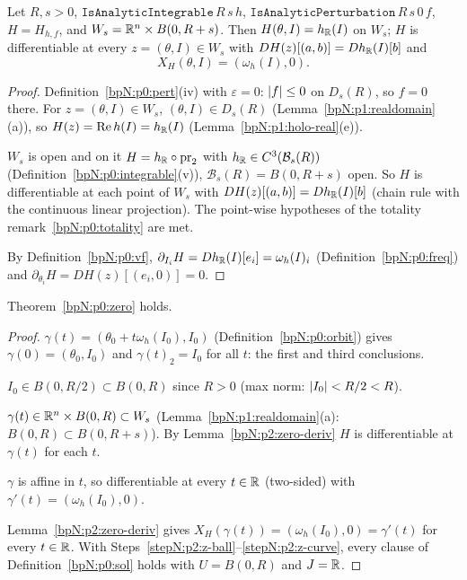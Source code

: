 \begin{lemma}\label{bpN:p2:zero-deriv}
Let $R,s>0$, $\texttt{IsAnalyticIntegrable}\,R\,s\,h$, $\texttt{IsAnalyticPerturbation}\,R\,s\,0\,f$, $H=H_{h,f}$, and $W_s=\mathbb{R}^n\times B(0,R+s)$. Then $H(\theta,I)=h_{\mathbb{R}}(I)$ on $W_s$; $H$ is differentiable at every $z=(\theta,I)\in W_s$ with $DH(z)[(a,b)]=Dh_{\mathbb{R}}(I)[b]$ and
\[X_H(\theta,I)=(\omega_h(I),0).\]
\end{lemma}
\begin{proof}
\label{stepN:p2:zd-zero} Definition~\ref{bpN:p0:pert}(iv) with $\varepsilon=0$: $\lvert f\rvert\le0$ on $D_s(R)$, so $f=0$ there. For $z=(\theta,I)\in W_s$, $(\theta,I)\in D_s(R)$ (Lemma~\ref{bpN:p1:realdomain}(a)), so $H(z)=\operatorname{Re}h(I)=h_{\mathbb{R}}(I)$ (Lemma~\ref{bpN:p1:holo-real}(e)).

\label{stepN:p2:zd-diff} $W_s$ is open and on it $H=h_{\mathbb{R}}\circ\mathrm{pr}_2$ with $h_{\mathbb{R}}\in C^3(\mathcal B_s(R))$ (Definition~\ref{bpN:p0:integrable}(v)), $\mathcal B_s(R)=B(0,R+s)$ open. So $H$ is differentiable at each point of $W_s$ with $DH(z)[(a,b)]=Dh_{\mathbb{R}}(I)[b]$ (chain rule with the continuous linear projection). The point-wise hypotheses of the totality remark~\ref{bpN:p0:totality} are met.

\label{stepN:p2:zd-field} By Definition~\ref{bpN:p0:vf}, $\partial_{I_i}H=Dh_{\mathbb{R}}(I)[e_i]=\omega_h(I)_i$ (Definition~\ref{bpN:p0:freq}) and $\partial_{\theta_i}H=DH(z)[(e_i,0)]=0$.
\end{proof}

\begin{theorem}[N-ZERO]\label{bpN:p2:zero}
Theorem~\ref{bpN:p0:zero} holds.
\end{theorem}
\begin{proof}
\label{stepN:p2:z-init} $\gamma(t)=(\theta_0+t\omega_h(I_0),I_0)$ (Definition~\ref{bpN:p0:orbit}) gives $\gamma(0)=(\theta_0,I_0)$ and $\gamma(t)_2=I_0$ for all $t$: the first and third conclusions.

\label{stepN:p2:z-ball} $I_0\in B(0,R/2)\subset B(0,R)$ since $R>0$ (max norm: $\lvert I_0\rvert<R/2<R$).

\label{stepN:p2:z-H} $\gamma(t)\in\mathbb{R}^n\times B(0,R)\subset W_s$ (Lemma~\ref{bpN:p1:realdomain}(a): $B(0,R)\subset B(0,R+s)$). By Lemma~\ref{bpN:p2:zero-deriv} $H$ is differentiable at $\gamma(t)$ for each $t$.

\label{stepN:p2:z-curve} $\gamma$ is affine in $t$, so differentiable at every $t\in\mathbb{R}$ (two-sided) with $\gamma'(t)=(\omega_h(I_0),0)$.

\label{stepN:p2:z-eq} Lemma~\ref{bpN:p2:zero-deriv} gives $X_H(\gamma(t))=(\omega_h(I_0),0)=\gamma'(t)$ for every $t\in\mathbb{R}$. With Steps~\ref{stepN:p2:z-ball}--\ref{stepN:p2:z-curve}, every clause of Definition~\ref{bpN:p0:sol} holds with $U=B(0,R)$ and $J=\mathbb{R}$.
\end{proof}

